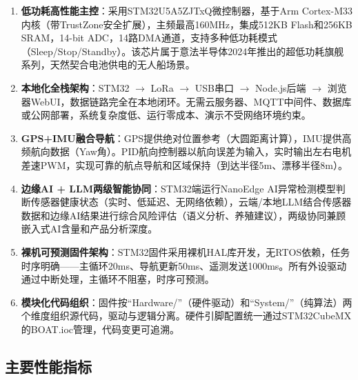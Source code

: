 \documentclass[12pt,a4paper]{ctexart}
\begin{document}
\begin{enumerate}[label=\arabic*.]
    \item \textbf{低功耗高性能主控}：采用STM32U5A5ZJTxQ微控制器，基于Arm Cortex-M33内核（带TrustZone安全扩展），主频最高160MHz，集成512KB Flash和256KB SRAM，14-bit ADC，14路DMA通道，支持多种低功耗模式（Sleep/Stop/Standby）。该芯片属于意法半导体2024年推出的超低功耗旗舰系列，天然契合电池供电的无人船场景。

    \item \textbf{本地化全栈架构}：STM32 $\rightarrow$ LoRa $\rightarrow$ USB串口 $\rightarrow$ Node.js后端 $\rightarrow$ 浏览器WebUI，数据链路完全在本地闭环。无需云服务器、MQTT中间件、数据库或公网部署，系统复杂度低、运行零成本、演示不受网络环境约束。

    \item \textbf{GPS+IMU融合导航}：GPS提供绝对位置参考（大圆距离计算），IMU提供高频航向数据（Yaw角）。PID航向控制器以航向误差为输入，实时输出左右电机差速PWM，实现可靠的航点导航和区域保持（到达半径5m、漂移半径8m）。

    \item \textbf{边缘AI + LLM两级智能协同}：STM32端运行NanoEdge AI异常检测模型判断传感器健康状态（实时、低延迟、无网络依赖），云端/本地LLM结合传感器数据和边缘AI结果进行综合风险评估（语义分析、养殖建议），两级协同兼顾嵌入式AI含量和产品分析深度。

    \item \textbf{裸机可预测固件架构}：STM32固件采用裸机HAL库开发，无RTOS依赖，任务时序明确——主循环20ms、导航更新50ms、遥测发送1000ms。所有外设驱动通过中断处理，主循环不阻塞，时序可预测。

    \item \textbf{模块化代码组织}：固件按``Hardware/''（硬件驱动）和``System/''（纯算法）两个维度组织源代码，驱动与逻辑分离。硬件引脚配置统一通过STM32CubeMX的BOAT.ioc管理，代码变更可追溯。
\end{enumerate}

\subsection{主要性能指标}
\end{document}

